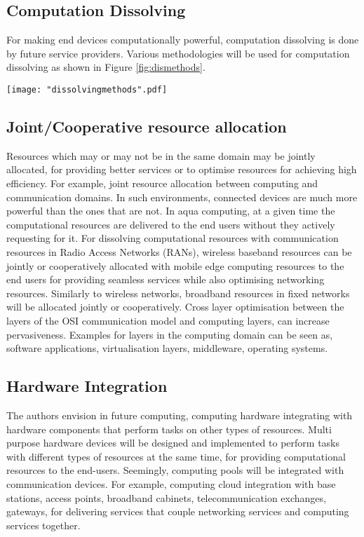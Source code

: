 \documentclass[12pt,journal,compsoc, onecolumn]{IEEEtran}
\begin{document}
\subsection{Computation Dissolving}
\label{sec:cdissolving}

 For making end devices computationally powerful, computation dissolving is done by future service providers. Various methodologies will be used for computation dissolving as shown in Figure \ref{fig:dismethods}.

 \begin{figure*}[ht]
 \centering
 \texttt{[image: "dissolvingmethods".pdf]}
 \caption{\label{fig:dismethods} Computation Dissolving: Methodologies}
 \end{figure*} 
 
\subsection*{Joint/Cooperative resource allocation}

Resources which may or may not be in the same domain may be jointly allocated, for providing better services or to optimise resources for achieving high efficiency. For example, joint resource allocation between computing and communication domains. In such environments, connected devices are much more powerful than the ones that are not. In aqua computing, at a given time the computational resources are delivered to the end users without they actively requesting for it. For dissolving computational resources with communication resources in Radio Access Networks (RANs), wireless baseband resources can be jointly or cooperatively allocated with mobile edge computing resources to the end users for providing seamless services while also optimising networking resources. Similarly to wireless networks, broadband resources in fixed networks will be allocated jointly or cooperatively. Cross layer optimisation between the layers of the OSI communication model and computing layers, can increase pervasiveness. Examples for layers in the computing domain can be seen as, software applications, virtualisation layers, middleware, operating systems.
 
\subsection*{Hardware Integration}

The authors envision in future computing, computing hardware integrating with hardware components that perform tasks on other types of resources.  Multi purpose hardware devices will be designed and implemented to perform tasks with different types of resources at the same time, for providing computational resources to the end-users. Seemingly, computing pools will be integrated with communication devices. For example, computing cloud integration with base stations, access points, broadband cabinets, telecommunication exchanges, gateways, for delivering services that couple networking services and computing services together. 
\end{document}
